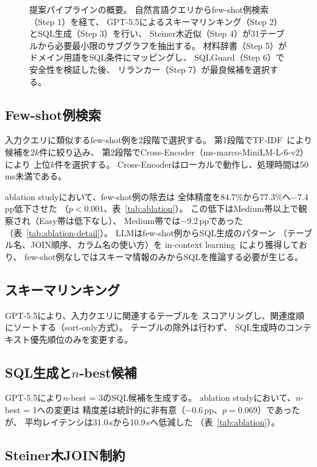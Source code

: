 \documentclass[5p,twocolumn]{elsarticle}
\begin{document}
\begin{figure}[htbp]
{\begin{tikzpicture}
\end{tikzpicture}%
}%
\caption{提案パイプラインの概要。
  自然言語クエリからfew-shot例検索（Step 1）を経て、
  GPT-5.5によるスキーマリンキング（Step 2）とSQL生成（Step 3）を行い、
  Steiner木近似（Step 4）が31テーブルから必要最小限のサブグラフを抽出する。
  材料辞書（Step 5）がドメイン用語をSQL条件にマッピングし、
  SQLGuard（Step 6）で安全性を検証した後、
  リランカー（Step 7）が最良候補を選択する。}
\label{fig:pipeline}
\end{figure}

\subsection{Few-shot例検索}
\label{sec:fewshot}

入力クエリに類似するfew-shot例を2段階で選択する。
第1段階でTF-IDF~\cite{salton1988tfidf}により候補を$2k$件に絞り込み、
第2段階でCross-Encoder（ms-marco-MiniLM-L-6-v2）により
上位$k$件を選択する。
Cross-Encoderはローカルで動作し、処理時間は50\,ms未満である。

ablation studyにおいて、few-shot例の除去は
全体精度を84.7\%から77.3\%へ$-$7.4\,pp低下させた
（$p<0.001$、表~\ref{tab:ablation}）。
この低下はMedium帯以上で観察され（Easy帯は低下なし）、
Medium帯では$-$9.2\,ppであった（表~\ref{tab:ablation-detail}）。
LLMはfew-shot例からSQL生成のパターン
（テーブル名、JOIN順序、カラム名の使い方）を
in-context learning~\cite{brown2020fewshot}により獲得しており、
few-shot例なしではスキーマ情報のみからSQLを推論する必要が生じる。

\subsection{スキーマリンキング}

GPT-5.5により、入力クエリに関連するテーブルを
スコアリングし、関連度順にソートする（sort-only方式）。
テーブルの除外は行わず、
SQL生成時のコンテキスト優先順位のみを変更する。

\subsection{SQL生成と$n$-best候補}

GPT-5.5により$n$-best = 3のSQL候補を生成する。
ablation studyにおいて、$n$-best = 1への変更は
精度差は統計的に非有意（$-$0.6\,pp、$p=0.069$）であったが、
平均レイテンシは31.0\,sから10.9\,sへ低減した
（表~\ref{tab:ablation}）。

\subsection{Steiner木JOIN制約}
\label{sec:schema_graph}
\end{document}
